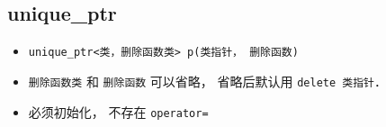 
\subsection{unique_ptr}
\begin{itemize}
\item \verb|unique_ptr<类，删除函数类> p(类指针， 删除函数)|
\item \verb|删除函数类| 和 \verb|删除函数| 可以省略， 省略后默认用 \verb|delete 类指针|．
\item 必须初始化， 不存在 \verb|operator=|
\end{itemize}
